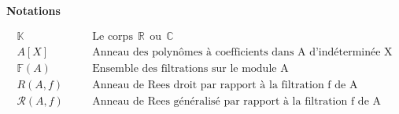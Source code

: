 \newpage

\begin{center}
	\LARGE{\textbf{Notations}}
\end{center}


\begin{eqnarray*}
	\mathbb{K} & & \quad \text{Le  corps} \ \ \mathbb{R} \ \ \text{ou} \ \ \mathbb{C}\\
	A[X] & & \quad \text{Anneau des polynômes à coefficients dans A d'indéterminée X}\\
	\mathbb{F}(A) & & \quad \text{Ensemble des filtrations sur le module A}\\
	R(A,f) & & \quad \text{Anneau de Rees droit par rapport à la filtration f de A}\\
	\mathcal{R}(A,f) & & \quad \text{Anneau de Rees généralisé par rapport à la filtration f de A}\\
\end{eqnarray*}